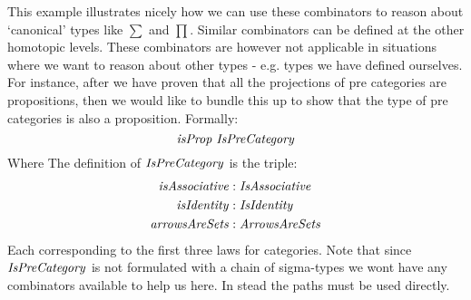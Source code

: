 This example illustrates nicely how we can use these combinators to reason about
`canonical' types like $\sum$ and $\prod$. Similar combinators can be defined at
the other homotopic levels. These combinators are however not applicable in
situations where we want to reason about other types - e.g. types we have
defined ourselves. For instance, after we have proven that all the projections
of pre categories are propositions, then we would like to bundle this up to show
that the type of pre categories is also a proposition. Formally:
%
\begin{equation}
\label{eq:propIsPreCategory}
\isProp\ \IsPreCategory
\end{equation}
%
Where The definition of $\IsPreCategory$ is the triple:
%
\begin{align*}
\var{isAssociative} & \tp \var{IsAssociative}\\
\isIdentity    & \tp \var{IsIdentity}\\
\var{arrowsAreSets} & \tp \var{ArrowsAreSets}
\end{align*}
%
Each corresponding to the first three laws for categories. Note that since
$\IsPreCategory$ is not formulated with a chain of sigma-types we wont have any
combinators available to help us here. In stead the paths must be used directly.

